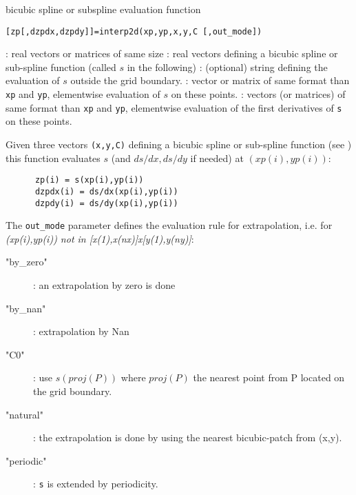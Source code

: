 

\begin{mandesc}
 {bicubic spline or subspline evaluation function}
\end{mandesc}

\begin{calling_sequence}
\begin{verbatim}
[zp[,dzpdx,dzpdy]]=interp2d(xp,yp,x,y,C [,out_mode])
\end{verbatim}
\end{calling_sequence}


\begin{parameters}
  \begin{varlist}
   : real vectors or matrices of same size
   : real vectors defining a bicubic spline or sub-spline function 
                (called $s$ in the following)
   : (optional) string defining the evaluation of $s$ outside 
                the grid boundary.
   : vector or matrix of same format than \verb!xp! and \verb!yp!, elementwise 
                evaluation of $s$ on these points.
   : vectors (or matrices) of same format than \verb!xp! and \verb!yp!, elementwise
                evaluation of the first derivatives of \verb!s! on these points.
  \end{varlist}
\end{parameters}

\begin{mandescription}
  Given three vectors \verb!(x,y,C)! defining a bicubic spline or sub-spline function
  (see  ) this function evaluates $s$ 
  (and $ds/dx, ds/dy$ if needed) at $(xp(i),yp(i))$:
    \begin{verbatim}
      zp(i) = s(xp(i),yp(i))   
      dzpdx(i) = ds/dx(xp(i),yp(i))
      dzpdy(i) = ds/dy(xp(i),yp(i))  
    \end{verbatim}

  The \verb!out_mode! parameter defines the evaluation rule for extrapolation,
  i.e. for {\em (xp(i),yp(i)) not in [x(1),x(nx)]x[y(1),y(ny)]}: 
  \begin{description}
  \item["by\_zero"]: an extrapolation by zero is done
  \item["by\_nan"]: extrapolation by Nan
  \item["C0"]:  use $s(proj(P))$ where $proj(P)$ the nearest point from P located on the grid boundary.
  \item["natural"]: the extrapolation is done by using the nearest bicubic-patch from (x,y).
  \item["periodic"]: \verb!s! is extended by periodicity. 
  \end{description}

\end{mandescription}

